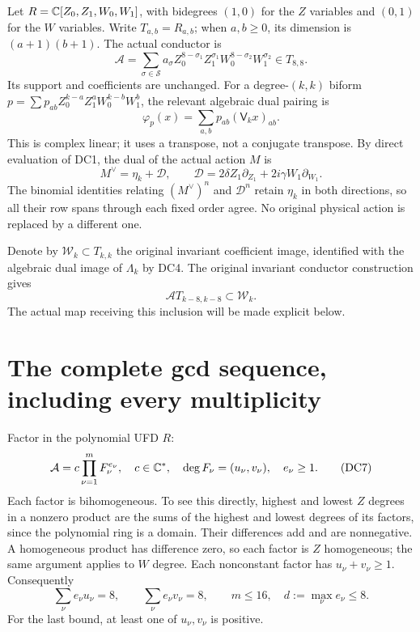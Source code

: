 Let $R=\mathbb C[Z_0,Z_1,W_0,W_1]$, with bidegrees $(1,0)$ for the $Z$
variables and $(0,1)$ for the $W$ variables.  Write $T_{a,b}=R_{a,b}$;
when $a,b\ge0$, its dimension is $(a+1)(b+1)$.  The actual conductor is
\[
 \mathcal A=\sum_{\sigma\in\mathcal S}a_\sigma
 Z_0^{8-\sigma_1}Z_1^{\sigma_1}
 W_0^{8-\sigma_2}W_1^{\sigma_2}\in T_{8,8}.                       \tag{DC3}
\]
Its support and coefficients are unchanged.  For a degree-$(k,k)$
biform $p=\sum p_{ab}Z_0^{k-a}Z_1^aW_0^{k-b}W_1^b$, the relevant
algebraic dual pairing is
\[
 \varphi_p(x)=\sum_{a,b}p_{ab}(\mathsf V_kx)_{ab}.                \tag{DC4}
\]
This is complex linear; it uses a transpose, not a conjugate transpose.
By direct evaluation of DC1, the dual of the actual action $M$ is
\[
 M^\vee=\eta_k+\mathcal D,\qquad
 \mathcal D=2\delta Z_1\partial_{Z_1}
                 +2i\gamma W_1\partial_{W_1}.                   \tag{DC5}
\]
The binomial identities relating $(M^\vee)^n$ and $\mathcal D^n$
retain $\eta_k$ in both directions, so all their row spans through
each fixed order agree.  No original physical action is replaced by a
different one.

Denote by $\mathcal W_k\subset T_{k,k}$ the original invariant
coefficient image, identified with the algebraic dual image of
$\Lambda_k$ by DC4.  The original invariant conductor construction
gives
\[
 \mathcal A T_{k-8,k-8}\subset\mathcal W_k.                       \tag{DC6}
\]
The actual map receiving this inclusion will be made explicit below.

\section{The complete gcd sequence, including every multiplicity}
Factor in the polynomial UFD $R$:
\[
 \mathcal A=c\prod_{\nu=1}^{m}F_\nu^{e_\nu},\quad
 c\in\mathbb C^*,\quad \deg F_\nu=(u_\nu,v_\nu),
 \quad e_\nu\ge1.                                               \tag{DC7}
\]
Each factor is bihomogeneous.  To see this directly, highest and
lowest $Z$ degrees in a nonzero product are the sums of the highest
and lowest degrees of its factors, since the polynomial ring is a
domain.  Their differences add and are nonnegative.  A homogeneous
product has difference zero, so each factor is $Z$ homogeneous;
the same argument applies to $W$ degree.  Each nonconstant factor has
$u_\nu+v_\nu\ge1$.  Consequently
\[
 \sum_\nu e_\nu u_\nu=8,\qquad
 \sum_\nu e_\nu v_\nu=8,\qquad m\le16,
 \quad d:=\max_\nu e_\nu\le8.                                   \tag{DC8}
\]
For the last bound, at least one of $u_\nu,v_\nu$ is positive.

